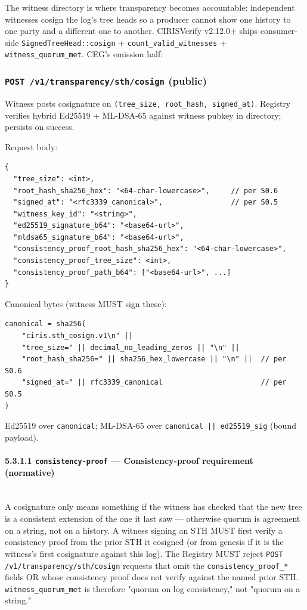 \documentclass[11pt]{article}
\begin{document}
The witness directory is where transparency becomes accountable: independent witnesses cosign the log's tree heads so a producer cannot show one history to one party and a different one to another. CIRISVerify v2.12.0+ ships consumer-side \texttt{SignedTreeHead::cosign} + \texttt{count\_valid\_witnesses} + \texttt{witness\_quorum\_met}. CEG's emission half:


\subsubsection*{\texttt{POST /v1/transparency/sth/cosign} (public)}


Witness posts cosignature on \texttt{(tree\_size, root\_hash, signed\_at)}. Registry verifies hybrid Ed25519 + ML-DSA-65 against witness pubkey in directory; persists on success.


Request body:


\begin{lstlisting}
{
  "tree_size": <int>,
  "root_hash_sha256_hex": "<64-char-lowercase>",     // per S0.6
  "signed_at": "<rfc3339_canonical>",                // per S0.5
  "witness_key_id": "<string>",
  "ed25519_signature_b64": "<base64-url>",
  "mldsa65_signature_b64": "<base64-url>",
  "consistency_proof_root_hash_sha256_hex": "<64-char-lowercase>",
  "consistency_proof_tree_size": <int>,
  "consistency_proof_path_b64": ["<base64-url>", ...]
}
\end{lstlisting}

Canonical bytes (witness MUST sign these):


\begin{lstlisting}
canonical = sha256(
    "ciris.sth_cosign.v1\n" ||
    "tree_size=" || decimal_no_leading_zeros || "\n" ||
    "root_hash_sha256=" || sha256_hex_lowercase || "\n" ||  // per S0.6
    "signed_at=" || rfc3339_canonical                       // per S0.5
)
\end{lstlisting}

Ed25519 over \texttt{canonical}; ML-DSA-65 over \texttt{canonical || ed25519\_sig} (bound payload).


\paragraph{5.3.1.1 \texttt{consistency-proof} — Consistency-proof requirement (normative)}\mbox{}\\


A cosignature only means something if the witness has checked that the new tree is a consistent extension of the one it last saw — otherwise quorum is agreement on a string, not on a history. A witness signing an STH MUST first verify a consistency proof from the prior STH it cosigned (or from genesis if it is the witness's first cosignature against this log). The Registry MUST reject \texttt{POST /v1/transparency/sth/cosign} requests that omit the \texttt{consistency\_proof\_*} fields OR whose consistency proof does not verify against the named prior STH. \texttt{witness\_quorum\_met} is therefore "quorum on log consistency," not "quorum on a string."
\end{document}
